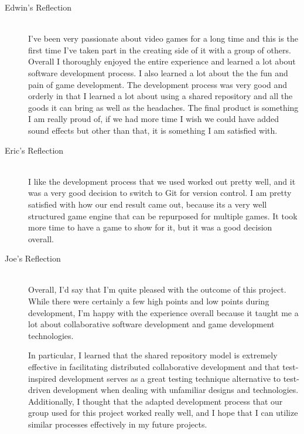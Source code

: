 \documentclass{article}
\begin{document}
\begin{description}
			\item[Edwin's Reflection] \hfill \\
			I've been very passionate about video games for a long time and this
			is the first time I've taken part in the creating side of it with a group of
			others. Overall I thoroughly enjoyed the entire experience and learned a lot
			about software development process. I also learned a lot about the the fun
			and pain of game development. The development process was very good
			and orderly in that I learned a lot about using a shared repository and all the
			goods it can bring as well as the headaches. The final product is something
			I am really proud of, if we had more time I wish we could have added
			sound effects but other than that, it is something I am satisfied with.

			\item[Eric's Reflection] \hfill \\
			I like the development process that we used worked out pretty well,
			and it was a very good decision to switch to Git for version control. I
			am pretty satisfied with how our end result came out, because its
			a very well structured game engine that can be repurposed for multiple
			games. It took more time to have a game to show for it, but it was a
			good decision overall.

			\item[Joe's Reflection] \hfill \\
			Overall, I'd say that I'm quite pleased with the outcome of this
			project.  While there were certainly a few high points and low points
			during development, I'm happy with the experience overall because it
			taught me a lot about collaborative software development and game
			development technologies.

			In particular, I learned that the shared repository model is extremely
			effective in facilitating distributed collaborative development and
			that test-inspired development serves as a great testing technique
			alternative to test-driven development when dealing with unfamiliar
			designs and technologies.  Additionally, I thought that the adapted
			development process that our group used for this project worked really
			well, and I hope that I can utilize similar processes effectively
			in my future projects.
	\end{description}
\end{document}
